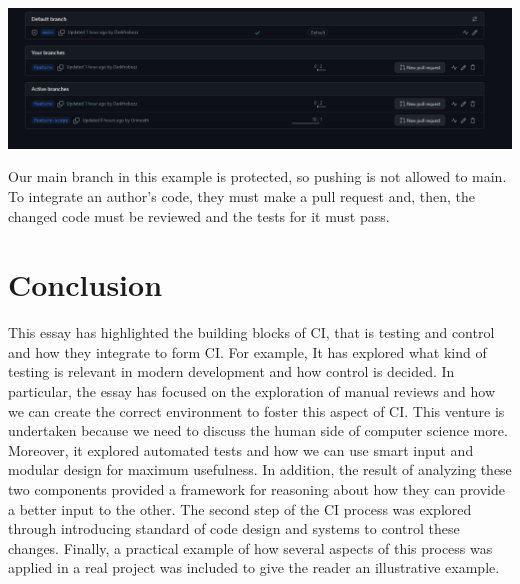 \documentclass{article}
\begin{document}
\includegraphics[width=\linewidth]{Screenshot 2023-11-29 161625.png}

Our main branch in this example is protected, so pushing is not allowed to main. 
To integrate an author's code, they must make a pull request and, then, the changed code must be reviewed and the tests for it must pass. 

\section{Conclusion}

This essay has highlighted the building blocks of CI, that is testing and control and how they integrate to form CI.
For example, It has explored what kind of testing is relevant in modern development and how control is decided.
In particular, the essay has focused on the exploration of manual reviews and how we can create the correct environment to foster this aspect of CI. 
This venture is undertaken because we need to discuss the human side of computer science more. \cite{senthil_behind_2023}
Moreover, it explored automated tests and how we can use smart input and modular design for maximum usefulness.
In addition, the result of analyzing these two components provided a framework for reasoning about how they can provide a better input to the other. 
The second step of the CI process was explored through introducing standard of code design and systems to control these changes.
Finally, a practical example of how several aspects of this process was applied in a real project was included to give the reader an illustrative example.
\newpage
\printbibliography
\end{document}

